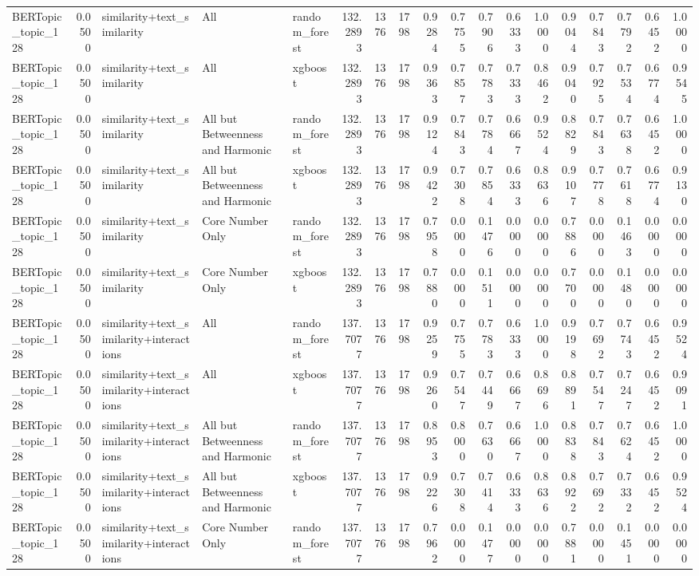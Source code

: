 \begin{tabular}{lrlllrrrrrrrrrrrrr}
BERTopic_topic_128 & 0.0500 & similarity+text_similarity & All & random_forest & 132.2893 & 1376 & 1798 & 0.9284 & 0.7755 & 0.7906 & 0.6333 & 1.0000 & 0.9044 & 0.7843 & 0.7792 & 0.6452 & 1.0000 \\
BERTopic_topic_128 & 0.0500 & similarity+text_similarity & All & xgboost & 132.2893 & 1376 & 1798 & 0.9363 & 0.7857 & 0.7783 & 0.7333 & 0.8462 & 0.9040 & 0.7925 & 0.7534 & 0.6774 & 0.9545 \\
BERTopic_topic_128 & 0.0500 & similarity+text_similarity & All but Betweenness and Harmonic & random_forest & 132.2893 & 1376 & 1798 & 0.9124 & 0.7843 & 0.7784 & 0.6667 & 0.9524 & 0.8829 & 0.7843 & 0.7638 & 0.6452 & 1.0000 \\
BERTopic_topic_128 & 0.0500 & similarity+text_similarity & All but Betweenness and Harmonic & xgboost & 132.2893 & 1376 & 1798 & 0.9422 & 0.7308 & 0.7854 & 0.6333 & 0.8636 & 0.9107 & 0.7778 & 0.7618 & 0.6774 & 0.9130 \\
BERTopic_topic_128 & 0.0500 & similarity+text_similarity & Core Number Only & random_forest & 132.2893 & 1376 & 1798 & 0.7958 & 0.0000 & 0.1476 & 0.0000 & 0.0000 & 0.7886 & 0.0000 & 0.1463 & 0.0000 & 0.0000 \\
BERTopic_topic_128 & 0.0500 & similarity+text_similarity & Core Number Only & xgboost & 132.2893 & 1376 & 1798 & 0.7880 & 0.0000 & 0.1511 & 0.0000 & 0.0000 & 0.7700 & 0.0000 & 0.1480 & 0.0000 & 0.0000 \\
BERTopic_topic_128 & 0.0500 & similarity+text_similarity+interactions & All & random_forest & 137.7077 & 1376 & 1798 & 0.9259 & 0.7755 & 0.7783 & 0.6333 & 1.0000 & 0.9198 & 0.7692 & 0.7743 & 0.6452 & 0.9524 \\
BERTopic_topic_128 & 0.0500 & similarity+text_similarity+interactions & All & xgboost & 137.7077 & 1376 & 1798 & 0.9260 & 0.7547 & 0.7449 & 0.6667 & 0.8696 & 0.8891 & 0.7547 & 0.7247 & 0.6452 & 0.9091 \\
BERTopic_topic_128 & 0.0500 & similarity+text_similarity+interactions & All but Betweenness and Harmonic & random_forest & 137.7077 & 1376 & 1798 & 0.8953 & 0.8000 & 0.7630 & 0.6667 & 1.0000 & 0.8838 & 0.7843 & 0.7624 & 0.6452 & 1.0000 \\
BERTopic_topic_128 & 0.0500 & similarity+text_similarity+interactions & All but Betweenness and Harmonic & xgboost & 137.7077 & 1376 & 1798 & 0.9226 & 0.7308 & 0.7414 & 0.6333 & 0.8636 & 0.8922 & 0.7692 & 0.7332 & 0.6452 & 0.9524 \\
BERTopic_topic_128 & 0.0500 & similarity+text_similarity+interactions & Core Number Only & random_forest & 137.7077 & 1376 & 1798 & 0.7962 & 0.0000 & 0.1477 & 0.0000 & 0.0000 & 0.7881 & 0.0000 & 0.1451 & 0.0000 & 0.0000 \\

\end{tabular}
